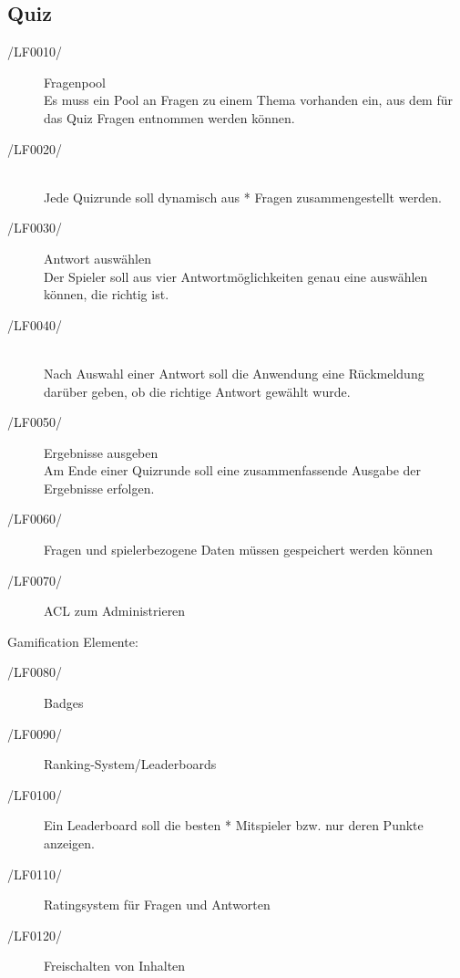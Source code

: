 \documentclass[11pt,a4paper]{scrreprt}
\begin{document}
\subsection{Quiz}
\begin{description}
\item[/LF0010/] Fragenpool \\
Es muss ein Pool an Fragen zu einem Thema vorhanden ein, aus dem für das Quiz Fragen entnommen werden können.
\item[/LF0020/] \ \\
Jede Quizrunde soll dynamisch aus * Fragen zusammengestellt werden.
\item[/LF0030/] Antwort auswählen \\
Der Spieler soll aus vier Antwortmöglichkeiten genau eine auswählen können, die richtig ist.
\item[/LF0040/] \ \\ 
Nach Auswahl einer Antwort soll die Anwendung eine Rückmeldung darüber geben, ob die richtige Antwort gewählt wurde. %
\item[/LF0050/] Ergebnisse ausgeben \\
Am Ende einer Quizrunde soll eine zusammenfassende Ausgabe der Ergebnisse erfolgen.
\end{description}
\begin{description}
\item[/LF0060/] Fragen und spielerbezogene Daten müssen gespeichert werden können
\item[/LF0070/] ACL zum Administrieren
\end{description}
Gamification Elemente:
\begin{description}
\item[/LF0080/] Badges
\item[/LF0090/] Ranking-System/Leaderboards 
\item[/LF0100/] Ein Leaderboard soll die besten * Mitspieler bzw. nur deren Punkte anzeigen.
\item[/LF0110/] Ratingsystem für Fragen und Antworten
\item[/LF0120/] Freischalten von Inhalten
\end{description}
\end{document}
